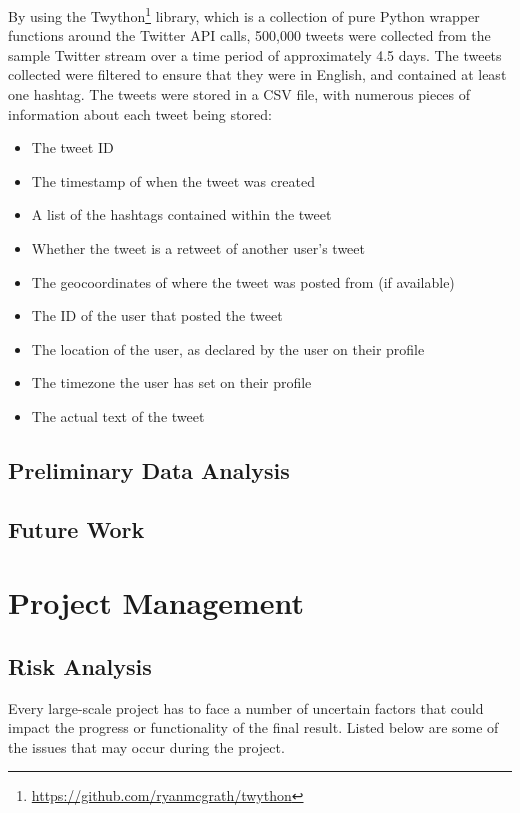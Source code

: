 \documentclass[12pt,a4paper]{article}
\begin{document}
By using the Twython\footnote{\url{https://github.com/ryanmcgrath/twython}} library, which is a collection of pure Python wrapper functions around the Twitter API calls, 500,000 tweets were collected from the sample Twitter stream over a time period of approximately 4.5 days. The tweets collected were filtered to ensure that they were in English, and contained at least one hashtag. The tweets were stored in a CSV file, with numerous pieces of information about each tweet being stored:
\begin{itemize}
    \item The tweet ID
    \item The timestamp of when the tweet was created
    \item A list of the hashtags contained within the tweet
    \item Whether the tweet is a retweet of another user's tweet
    \item The geocoordinates of where the tweet was posted from (if available)
    \item The ID of the user that posted the tweet
    \item The location of the user, as declared by the user on their profile
    \item The timezone the user has set on their profile
    \item The actual text of the tweet
\end{itemize}


\subsection{Preliminary Data Analysis}

\subsection{Future Work}

\pagebreak

\section{Project Management}
\subsection{Risk Analysis}
Every large-scale project has to face a number of uncertain factors that could impact the progress or functionality of the final result. Listed below are some of the issues that may occur during the project.
\end{document}
